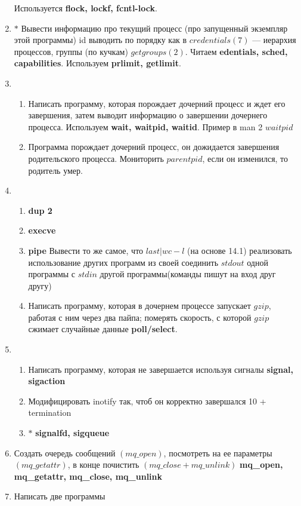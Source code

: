 \begin{enumerate}
    Используется \textbf{flock, lockf, fcntl-lock}. 
    
    \item  $\ast$ Вывести информацию про текущий процесс (про запущенный экземпляр этой программы)
id выводить по порядку как в $credentials(7)$ --- иерархия процессов, группы (по кучкам)
$getgroups(2)$. Читаем \textbf{edentials, sched, capabilities}. Используем \textbf{prlimit, getlimit}.

    \item 
    \begin{enumerate}
        \item Написать программу, которая порождает дочерний процесс и ждет его завершения, затем выводит информацию о завершении дочернего процесса. Используем \textbf{wait, waitpid, waitid}.
        Пример в man 2 $waitpid$
        \item Программа порождает дочерний процесс, он дожидается завершения родительского процесса. Мониторить $parentpid$, если он изменился, то родитель умер. 
 \end{enumerate}
 
    \item 
    \begin{enumerate}
        \item \textbf{dup 2}  
        \item \textbf{execve} 
        \item \textbf{pipe} Вывести то же самое, что $last | wc -l$
(на основе 14.1) реализовать использование других программ из своей
соединить $stdout$ одной программы с $stdin$ другой программы(команды пишут на вход друг другу)
        \item Написать программу, которая в дочернем процессе запускает $gzip$, работая с ним через два пайпа; померять скорость, с которой $gzip$ сжимает случайные данные \textbf{poll/select}. 
    \end{enumerate}
    \item \begin{enumerate}
        \item Написать программу, которая не завершается используя сигналы \textbf{signal, sigaction}
        \item Модифицировать inotify так, чтоб он корректно завершался 10 + termination
        \item $\ast$  \textbf{signalfd, sigqueue} 
    \end{enumerate}
    \item Создать очередь сообщений $(mq\_open)$, посмотреть на ее параметры $(mq\_getattr)$, в конце почистить $(mq\_close + mq\_unlink)$ \textbf{mq\_open, mq\_getattr, mq\_close, mq\_unlink} 
    \item Написать две программы


\end{enumerate}
